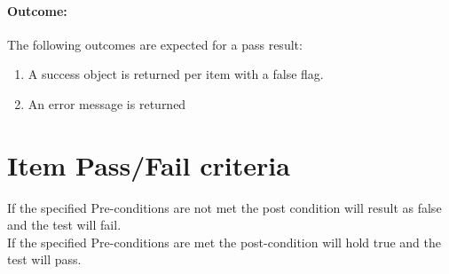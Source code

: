 \documentclass{article}
\begin{document}
\paragraph{Outcome:} The following outcomes are expected for a pass result:
\begin{enumerate}
	\item A success object is returned per item with a false flag.
	\item An error message is returned
\end{enumerate}




\pagebreak

\section{Item Pass/Fail criteria}\label{sec:FailPass}
If the specified Pre-conditions are not met the post condition will result as false and the test will fail. \\
If the specified Pre-conditions are met the post-condition will hold true and the test will pass.
\end{document}
